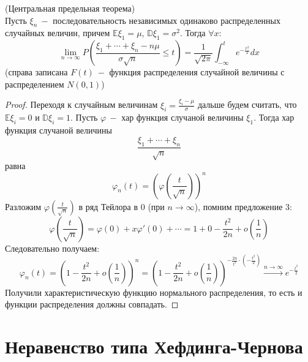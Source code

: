 \begin{theorem}(Центральная предельная теорема) \\
Пусть $\xi_n \ -$ последовательность независимых одинаково распределенных случайных величин, причем $ \mathbb{E}  \xi_1 = \mu$, $ \mathbb{D} \xi_1 = \sigma ^ 2$. Тогда $\forall x$:
\[
    \lim_{n \to \infty} P\left(\frac{\xi_1 + \cdots +\xi_n - n \mu}{\sigma \sqrt{n}} \leq t\right) = \frac{1}{\sqrt{2 \pi}} \int_{-\infty}^{t} e ^ {-\frac{x ^ 2}{2}}dx
\]
(справа записана $F\left(t\right) \ - $ функция распределения случайной величины с распределением $N\left(0, 1\right)$)

\end{theorem}
\begin{proof}
Переходя к случайным величинам $\xi_{i} = \frac{\xi_{i} - \mu}{\sigma}$ дальше будем считать, что $ \mathbb{E}  \xi_{i} = 0$ и $ \mathbb{D} \xi_{i} = 1$. Пусть $\varphi \ - $ хар функция случаной величины $\xi_1$. Тогда хар функция случаной величины 
\[
    \frac{\xi_1 + \cdots + \xi_n}{\sqrt{n}}
\]
равна 
\[
    \varphi_{n}\left(t\right) = \left(\varphi\left(\frac{t}{\sqrt{n}}\right)\right) ^ n
\]
Разложим $\varphi\left(\frac{t}{\sqrt{n}}\right)$ в ряд Тейлора в 0 (при $n \to \infty$), помним предложение 3:
\[
    \varphi\left(\frac{t}{\sqrt{n}}\right) = \varphi\left(0\right) + x\varphi'\left(0\right) + \cdots = 1 + 0 -\frac{t ^ 2}{2n} + o\left(\frac{1}{n}\right)
\]
Следовательно получаем:
\[
    \varphi_{n}\left(t\right) = \left(1 -\frac{t ^ 2}{2n} + o\left(\frac{1}{n}\right)\right) ^ n = \left(1 -\frac{t ^ 2}{2n} + o\left(\frac{1}{n}\right)\right) ^ {-\frac{2n}{t ^ 2} \cdot \left(-\frac{t ^ 2}{2}\right)} \xrightarrow{n \to \infty} e ^ {-\frac{t ^ 2}{2}}
\]
Получили характеристическую функцию нормального распределения, то есть и функции распределения должны совпадать.
\end{proof}


\clearpage

\section{Неравенство типа Хефдинга-Чернова}

